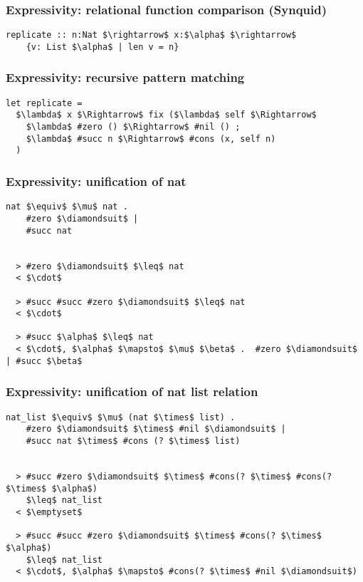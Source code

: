 \documentclass{beamer}
\begin{document}
\begin{frame}[fragile]

  \frametitle{Expressivity: relational function comparison (Synquid)}

  \begin{lstlisting}[keywords={termination, measure, data, where}]
  replicate :: n:Nat $\rightarrow$ x:$\alpha$ $\rightarrow$ 
    {v: List $\alpha$ | len v = n}

  \end{lstlisting}

  \hfill
\end{frame}

\begin{frame}[fragile]
  \frametitle{Expressivity: recursive pattern matching}
  \begin{lstlisting}[]
  let replicate = 
  $\lambda$ x $\Rightarrow$ fix ($\lambda$ self $\Rightarrow$
    $\lambda$ #zero () $\Rightarrow$ #nil () ;
    $\lambda$ #succ n $\Rightarrow$ #cons (x, self n)
  ) 
  \end{lstlisting}
\end{frame}


\begin{frame}[fragile]
  \frametitle{Expressivity: unification of nat}

  \begin{lstlisting}[]
  nat $\equiv$ $\mu$ nat .
    #zero $\diamondsuit$ | 
    #succ nat


  > #zero $\diamondsuit$ $\leq$ nat 
  < $\cdot$

  > #succ #succ #zero $\diamondsuit$ $\leq$ nat 
  < $\cdot$

  > #succ $\alpha$ $\leq$ nat 
  < $\cdot$, $\alpha$ $\mapsto$ $\mu$ $\beta$ .  #zero $\diamondsuit$ | #succ $\beta$
  \end{lstlisting} 

\end{frame}


\begin{frame}[fragile]
  \frametitle{Expressivity: unification of nat list relation}

  \begin{lstlisting}[]
  nat_list $\equiv$ $\mu$ (nat $\times$ list) .
    #zero $\diamondsuit$ $\times$ #nil $\diamondsuit$ | 
    #succ nat $\times$ #cons (? $\times$ list)


  > #succ #zero $\diamondsuit$ $\times$ #cons(? $\times$ #cons(? $\times$ $\alpha$) 
    $\leq$ nat_list
  < $\emptyset$

  > #succ #succ #zero $\diamondsuit$ $\times$ #cons(? $\times$ $\alpha$) 
    $\leq$ nat_list
  < $\cdot$, $\alpha$ $\mapsto$ #cons(? $\times$ #nil $\diamondsuit$)
  \end{lstlisting} 
\end{frame}
\end{document}

